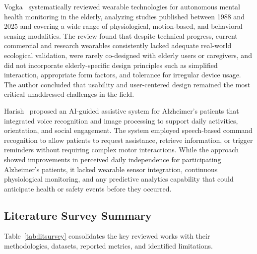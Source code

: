 \documentclass[conference]{IEEEtran}
\begin{document}
Vogka~\cite{vogka2025} systematically reviewed wearable technologies for
autonomous mental health monitoring in the elderly, analyzing studies
published between 1988 and 2025 and covering a wide range of physiological,
motion-based, and behavioral sensing modalities. The review found that
despite technical progress, current commercial and research wearables
consistently lacked adequate real-world ecological validation, were rarely
co-designed with elderly users or caregivers, and did not incorporate
elderly-specific design principles such as simplified interaction,
appropriate form factors, and tolerance for irregular device usage. The
author concluded that usability and user-centered design remained the most
critical unaddressed challenges in the field.

Harish~\cite{harish2025} proposed an AI-guided assistive system for
Alzheimer's patients that integrated voice recognition and image processing
to support daily activities, orientation, and social engagement. The system
employed speech-based command recognition to allow patients to request
assistance, retrieve information, or trigger reminders without requiring
complex motor interactions. While the approach showed improvements in
perceived daily independence for participating Alzheimer's patients, it
lacked wearable sensor integration, continuous physiological monitoring,
and any predictive analytics capability that could anticipate health or
safety events before they occurred.

\subsection{Literature Survey Summary}

Table~\ref{tab:litsurvey} consolidates the key reviewed works with their
methodologies, datasets, reported metrics, and identified limitations.
\end{document}

